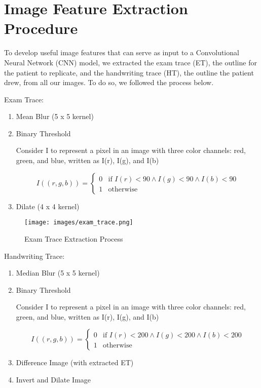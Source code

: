 \documentclass[pmlr,twocolumn,10pt]{jmlr} %
\begin{document}
\clearpage


\nocite{*}

\clearpage

\appendix

\section{Image Feature Extraction Procedure}
\label{app:imgextraction}

To develop useful image features that can serve as input to a Convolutional Neural Network (CNN) model, we extracted the exam trace (ET), the outline for the patient to replicate, and the handwriting trace (HT), the outline the patient drew, from all our images. To do so, we followed the process below.

Exam Trace:

\begin{enumerate}
\item Mean Blur (5 x 5 kernel)
\item Binary Threshold

Consider I to represent a pixel in an image with three color channels: red, green, and blue, written as I(r), I(g), and I(b)

\[I((r, g, b)) = \begin{cases} 
    0 & \text{if } I(r) < 90 \land I(g) < 90 \land I(b) < 90 \\
    1 & \text{otherwise}
\end{cases}\]

\item Dilate (4 x 4 kernel)
\end{enumerate}

\begin{figure}[h] 
\label{fig: fig2}
\centering 
\texttt{[image: images/exam\_trace.png]}
\caption{Exam Trace Extraction Process}
\end{figure}

\vfill\null
\columnbreak

Handwriting Trace:

\begin{enumerate}
\item Median Blur (5 x 5 kernel)
\item Binary Threshold

Consider I to represent a pixel in an image with three color channels: red, green, and blue, written as I(r), I(g), and I(b)

\[I((r, g, b)) = \begin{cases} 
    0 & \text{if } I(r) < 200 \land I(g) < 200 \land I(b) < 200 \\
    1 & \text{otherwise}
\end{cases}\]

\item Difference Image (with extracted ET)
\item Invert and Dilate Image
\end{enumerate}
\end{document}

